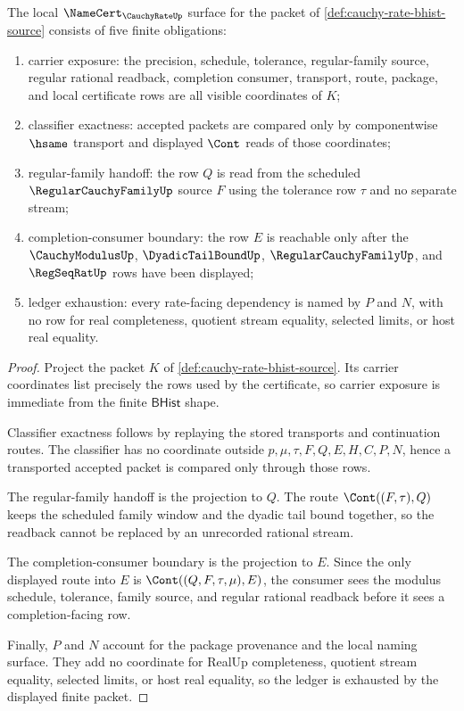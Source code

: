 \begin{theorem}
\label{thm:cauchy-rate-namecert-obligations}
The local $\NameCert_{\CauchyRateUp}$ surface for the packet of \autoref{def:cauchy-rate-bhist-source} consists of five finite obligations:
\begin{enumerate}
\item carrier exposure: the precision, schedule, tolerance, regular-family source, regular rational readback, completion consumer, transport, route, package, and local certificate rows are all visible coordinates of $K$;
\item classifier exactness: accepted packets are compared only by componentwise $\hsame$ transport and displayed $\Cont$ reads of those coordinates;
\item regular-family handoff: the row $Q$ is read from the scheduled $\RegularCauchyFamilyUp$ source $F$ using the tolerance row $\tau$ and no separate stream;
\item completion-consumer boundary: the row $E$ is reachable only after the $\CauchyModulusUp$, $\DyadicTailBoundUp$, $\RegularCauchyFamilyUp$, and $\RegSeqRatUp$ rows have been displayed;
\item ledger exhaustion: every rate-facing dependency is named by $P$ and $N$, with no row for real completeness, quotient stream equality, selected limits, or host real equality.
\end{enumerate}
\end{theorem}
\begin{proof}
Project the packet $K$ of \autoref{def:cauchy-rate-bhist-source}. Its carrier coordinates list precisely the rows used by the certificate, so carrier exposure is immediate from the finite $\mathsf{BHist}$ shape.

Classifier exactness follows by replaying the stored transports and continuation routes. The classifier has no coordinate outside $p,\mu,\tau,F,Q,E,H,C,P,N$, hence a transported accepted packet is compared only through those rows.

The regular-family handoff is the projection to $Q$. The route $\Cont((F,\tau),Q)$ keeps the scheduled family window and the dyadic tail bound together, so the readback cannot be replaced by an unrecorded rational stream.

The completion-consumer boundary is the projection to $E$. Since the only displayed route into $E$ is $\Cont((Q,F,\tau,\mu),E)$, the consumer sees the modulus schedule, tolerance, family source, and regular rational readback before it sees a completion-facing row.

Finally, $P$ and $N$ account for the package provenance and the local naming surface. They add no coordinate for RealUp completeness, quotient stream equality, selected limits, or host real equality, so the ledger is exhausted by the displayed finite packet.
\end{proof}

